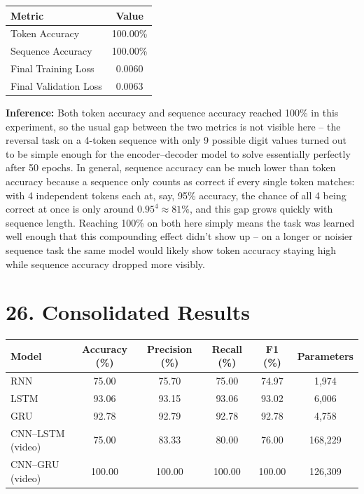 \documentclass[10pt]{article}
\begin{document}
\begin{center}
\begin{tabular}{|l|c|}
\hline
Metric & Value\\
\hline
Token Accuracy & 100.00\%\\
Sequence Accuracy & 100.00\%\\
Final Training Loss & 0.0060\\
Final Validation Loss & 0.0063\\
\hline
\end{tabular}
\end{center}

\textbf{Inference:} Both token accuracy and sequence accuracy reached
100\% in this experiment, so the usual gap between the two metrics is not visible
here -- the reversal task on a 4-token sequence with only 9 possible digit
values turned out to be simple enough for the encoder--decoder model to
solve essentially perfectly after 50 epochs. In general, sequence accuracy
can be much lower than token accuracy because a sequence only counts as
correct if every single token matches: with 4 independent tokens each at,
say, 95\% accuracy, the chance of all 4 being correct at once is only
around $0.95^4\approx81\%$, and this gap grows quickly with sequence
length. Reaching 100\% on both here simply means the task was learned
well enough that this compounding effect didn't show up -- on a longer or
noisier sequence task the same model would likely show token accuracy
staying high while sequence accuracy dropped more visibly.

\section*{26. Consolidated Results}

\begin{center}
\begin{tabular}{|l|c|c|c|c|c|}
\hline
Model & Accuracy (\%) & Precision (\%) & Recall (\%) & F1 (\%) & Parameters\\
\hline
RNN & 75.00 & 75.70 & 75.00 & 74.97 & 1,974\\
LSTM & 93.06 & 93.15 & 93.06 & 93.02 & 6,006\\
GRU & 92.78 & 92.79 & 92.78 & 92.78 & 4,758\\
CNN--LSTM (video) & 75.00 & 83.33 & 80.00 & 76.00 & 168,229\\
CNN--GRU (video) & 100.00 & 100.00 & 100.00 & 100.00 & 126,309\\
\hline
\end{tabular}
\end{center}
\end{document}

